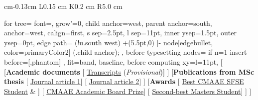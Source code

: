 \documentclass[10pt, letterpaper]{sulmancv}
\begin{document}
\begin{tabularx}{
             cm-0.13cm
        }{
            L{0.15 cm}
            K{0.2 cm}
            R{5.0 cm}
        }
            \begin{forest}
              for tree={
                font=\footnotesize,        
                grow'=0,
                child anchor=west,
                parent anchor=south,
                anchor=west,
                calign=first,
                s sep=2.5pt,               
                l sep=11pt,                
                inner ysep=1.5pt, outer ysep=0pt, 
                edge path={
                  \noexpand\path[draw=primaryColor2,\forestoption{edge}]
                    (!u.south west) +(5.5pt,0)
                    |- node[edgebullet, color=primaryColor2] {}        
                    (.child anchor);
                },
                before typesetting nodes={
                  if n=1 {insert before={[,phantom]}} {}
                },
                fit=band,
                baseline,                  
                before computing xy={l=11pt},
              }
                [\textcolor{primaryColor}{\faFolderOpen[regular]}
                [\textbf{Academic documents}
                  [\textcolor{primaryColor}{\faFilePdf} \hspace{0.2cm}\href{\detokenize{https://sulmanolieko.github.io/authors/admin/Olieko.pdf}}{Transcripts} (\textit{Provisional})]
                ]
                [\textbf{Publications from MSc thesis}
                  [\textcolor{primaryColor}{\faFilePdf[regular]} \hspace{0.2cm}\scriptsize\href{\detokenize{https://doi.org/10.1080/09670874.2024.2413592}}{Journal article 1}]
                  [\textcolor{primaryColor}{\faFilePdf[regular]} \hspace{0.2cm}\scriptsize\href{\detokenize{https://sulmanolieko.github.io/publication/wp/heterogeneous_efficiency__.pdf}}{Journal article 2}]
                ]
                [\textbf{Awards}
                  [\textcolor{primaryColor}{\faMedal} \quad \scriptsize\href{https://aercafrica.org/aerc-insights/african-economies-recovery-agenda-from-multiple-shocks/\#dflip-df\_17933/32/}{Best CMAAE SFSE Student} \& \href{https://aercafrica.org/aerc-insights/youth-demographic-dividend-migration-and-economic-opportunities-in-african-economies/\#dflip-df\_18350/56/}{ }]
                  [\textcolor{primaryColor}{\faMedal} \quad\scriptsize\href{\detokenize{https://sulmanolieko.github.io/authors/admin/Best Student Certificate - CMAAE SFSE 2022 Academic Board Prize_.pdf}}{CMAAE Academic Board Prize}]
                  [\textcolor{primaryColor}{\faMedal} \quad \scriptsize\href{\detokenize{https://www.uonbi.ac.ke/news/student-recognition-awards-booklet}}{Second-best Masters Student}]
                ]
                ]
            \end{forest}
            
        \end{tabularx}
        
\end{document}
